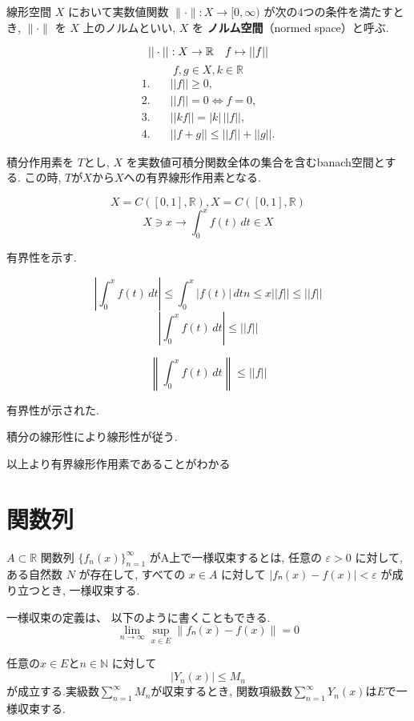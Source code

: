 \documentclass[12pt]{bxjsarticle}
\begin{document}
\begin{Definition}[ノルム空間]

線形空間 $X$ において実数値関数 $\|\cdot\|: X \to [0, \infty)$ が次の4つの条件を満たすとき, $\|\cdot\|$ を $X$ 上のノルムといい, $X$ を \textbf{ノルム空間}（normed space）と呼ぶ.

    \[
    ||\cdot|| : X \to \mathbb{R}\\ \quad f \mapsto ||f|| 
    \]
    \[f,g \in X,k \in \mathbb{R}\]
    \begin{align}
    1. \quad & ||f|| \geq 0, \\
    2. \quad & ||f|| = 0 \Leftrightarrow f = 0, \\
    3. \quad & ||kf|| = |k| \, ||f||, \\
    4. \quad & ||f+g|| \leq ||f|| + ||g||.
    \end{align}

\end{Definition}
\begin{Theorem}
    積分作用素を $T$とし, $X$ を実数値可積分関数全体の集合を含むbanach空間とする.
この時, $T$が$X$から$X$への有界線形作用素となる.
\end{Theorem}
\[X=C([0,1],\mathbb{R}),X=C([0,1],\mathbb{R})\]
\[X \ni x \to \int_0^x f(t) \, dt \in X \]

有界性を示す.

\[\displaystyle \left|\int_0^x f(t) \, dt \right| \leq \displaystyle \int_0^x |f(t)| \, dtn \leq x||f|| \leq ||f||\]
\[\displaystyle \left|\int_0^x f(t) \, dt \right| \leq  ||f|| \]

\[\displaystyle 
\left\| \int_0^x f(t) \, dt \right\|  \leq ||f||
\]
 

有界性が示された.

積分の線形性により線形性が従う.

以上より有界線形作用素であることがわかる

\section{関数列}
\label{sec:関数列}
\begin{Definition}[一様収束の定義]
$A \subset \mathbb{R}$
関数列 \(\{f_n(x)\}_{n=1}^\infty\) がA上で一様収束するとは, 任意の \(\varepsilon > 0\) に対して, ある自然数 \(N\) が存在して, すべての \(x \in A\) に対して
$|fₙ(x) - f(x)| < \varepsilon$ が成り立つとき, 一様収束する.

一様収束の定義は、 以下のように書くこともできる.
\[
\lim_{n \to \infty} \sup_{x \in E} \|fₙ(x) - f(x)\| = 0
\]
\end{Definition}
\begin{Theorem}[ワイエルシュトラスのM判定法]
任意の$x \in E$と$n \in \mathbb{N}$ に対して
\[\left|Y_{n}(x)\right| \leq M_{n}\]
が成立する.実級数$\displaystyle\sum_{n=1}^\infty M_{n} $が収束するとき, 関数項級数$\displaystyle\sum_{n=1}^\infty Y_{n}(x)$は$E$で一様収束する.
\end{Theorem}
\end{document}

